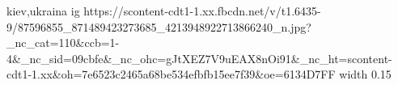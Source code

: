  
 
 
 
 

\par
kiev,ukraina
\ifcmt
  ig https://scontent-cdt1-1.xx.fbcdn.net/v/t1.6435-9/87596855_871489423273685_4213948922713866240_n.jpg?_nc_cat=110&ccb=1-4&_nc_sid=09cbfe&_nc_ohc=gJtXEZ7V9uEAX8nOi91&_nc_ht=scontent-cdt1-1.xx&oh=7e6523c2465a68be534efbfb15ee7f39&oe=6134D7FF
  width 0.15
\fi

